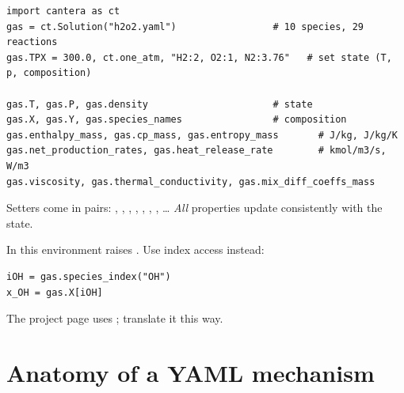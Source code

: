\begin{lstlisting}
import cantera as ct
gas = ct.Solution("h2o2.yaml")                 # 10 species, 29 reactions
gas.TPX = 300.0, ct.one_atm, "H2:2, O2:1, N2:3.76"   # set state (T, p, composition)

gas.T, gas.P, gas.density                      # state
gas.X, gas.Y, gas.species_names                # composition
gas.enthalpy_mass, gas.cp_mass, gas.entropy_mass       # J/kg, J/kg/K
gas.net_production_rates, gas.heat_release_rate        # kmol/m3/s, W/m3
gas.viscosity, gas.thermal_conductivity, gas.mix_diff_coeffs_mass
\end{lstlisting}

Setters come in pairs: , , , , , , , \dots
\emph{All} properties update consistently with the state.

\begin{warning}
In this environment  raises
. Use index access instead:
\begin{lstlisting}
iOH = gas.species_index("OH")
x_OH = gas.X[iOH]
\end{lstlisting}
The project page uses ; translate it this way.
\end{warning}

\section{Anatomy of a YAML mechanism}
\label{sec:ct-yaml}

